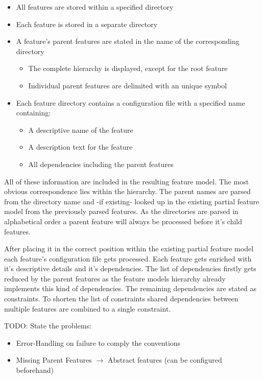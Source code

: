 \begin{itemize}
	\item All features are stored within a specified directory
	\item Each feature is stored in a separate directory
	\item A feature's parent features are stated in the name of the corresponding directory
	\begin{itemize}
		\item The complete hierarchy is displayed, except for the root feature
		\item Individual parent features are delimited with an unique symbol
	\end{itemize}
	\item Each feature directory contains a configuration file with a specified name containing:
	\begin{itemize}
		\item A descriptive name of the feature
		\item A description text for the feature
		\item All dependencies including the parent features
	\end{itemize}
\end{itemize}

All of these information are included in the resulting feature model. The most obvious correspondence lies within the hierarchy. The parent names are parsed from the directory name and -if existing- looked up in the existing partial feature model from the previously parsed features. As the directories are parsed in alphabetical order a parent feature will always be processed before it's child features.

After placing it in the correct position within the existing partial feature model each feature's configuration file gets processed. Each feature gets enriched with it's descriptive details and it's dependencies. The list of dependencies firstly gets reduced by the parent features as the feature models hierarchy already implements this kind of dependencies. The remaining dependencies are stated as constraints. To shorten the list of constraints shared dependencies between multiple features are combined to a single constraint.\\

{\color{red}TODO: State the problems:
\begin{itemize}
\item Error-Handling on failure to comply the conventions
\item Missing Parent Features $\rightarrow$ Abstract features (can be configured beforehand)
\end{itemize}}

